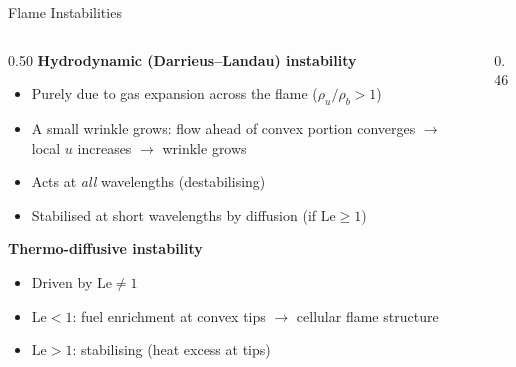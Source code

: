 \documentclass[12pt,aspectratio=169]{beamer}
\newcommand{\Le}{\mathrm{Le}}
\begin{document}
\begin{frame}{Flame Instabilities}

  \begin{columns}[t]
    \begin{column}{0.50\textwidth}
      \textbf{Hydrodynamic (Darrieus--Landau) instability}
      \begin{itemize}
        \item Purely due to gas expansion across the flame
              ($\rho_u / \rho_b > 1$)
        \item A small wrinkle grows: flow ahead of convex
              portion converges $\to$ local $u$ increases
              $\to$ wrinkle grows
        \item Acts at \emph{all} wavelengths (destabilising)
        \item Stabilised at short wavelengths by diffusion
              (if $\Le \geq 1$)
      \end{itemize}

      \medskip
      \textbf{Thermo-diffusive instability}
      \begin{itemize}
        \item Driven by $\Le \neq 1$
        \item $\Le < 1$: fuel enrichment at convex tips
              $\to$ cellular flame structure
        \item $\Le > 1$: stabilising (heat excess at tips)
      \end{itemize}
    \end{column}
    \begin{column}{0.46\textwidth}
      \centering
\end{column}
\end{columns}
\end{frame}
\end{document}
